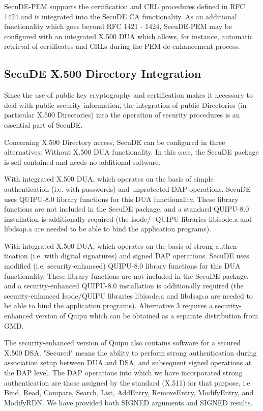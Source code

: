 SecuDE-PEM supports the certification and CRL procedures defined in 
RFC 1424 and is integrated into the SecuDE CA functionality. As an additional 
functionality which goes beyond RFC 1421 - 1424, SecuDE-PEM may be 
configured with an integrated X.500 DUA which allows, for instance, 
automatic retrieval of certificates and CRLs during the PEM de-enhancement process.


\subsection{SecuDE X.500 Directory Integration}
\label{x500}
Since the use of public key cryptography and certification makes it necessary
to deal with public security information, the integration of public Directories 
(in particular X.500 Directories) into the operation of security procedures
is an essential part of SecuDE.

Concerning X.500 Directory access, SecuDE can be configured in three 
alternatives:
\be
\m Without X.500 DUA functionality. In this case, the SecuDE package
     is self-contained and needs no additional software.

\m With integrated X.500 DUA, which operates on the basis of simple
     authentication (i.e. with passwords) and unprotected DAP operations.
     SecuDE uses QUIPU-8.0 library functions for this DUA functionality.
     These library functions are not included in the SecuDE package, and
     a standard QUIPU-8.0 installation is additionally required (the Isode/-
     QUIPU libraries libisode.a and libdsap.a are needed to be able to bind 
     the application programs).

\m With integrated X.500 DUA, which operates on the basis of strong authen-
     tication (i.e. with digital signatures) and signed DAP operations.
     SecuDE uses modified (i.e. security-enhanced) QUIPU-8.0 library 
     functions for this DUA functionality. These library functions are not 
     included in the SecuDE package, and a security-enhanced QUIPU-8.0 
     installation is additionally required (the security-enhanced Isode/QUIPU 
     libraries libisode.a and libdsap.a are needed to be able to bind the 
     application programs).
\ee
Alternative 3 requires a security-enhanced version of Quipu which can be
obtained as a separate distribution from GMD. 

The security-enhanced version of Quipu also contains software for a secured X.500 
DSA. "Secured" means the ability to perform strong authentication during
association setup between DUA and DSA, and subsequent signed operations at the 
DAP level. The DAP operations into which we have incorporated strong authentication 
are those assigned by the standard (X.511) for that purpose, i.e. Bind, Read, 
Compare, Search, List, AddEntry, RemoveEntry, ModifyEntry, and ModifyRDN. We have 
provided both SIGNED arguments and SIGNED results.

